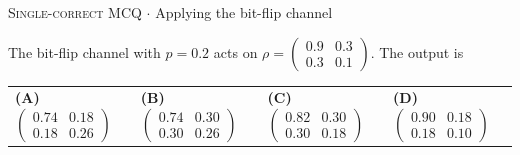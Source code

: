 \documentclass[11pt,a4paper]{article}
\newcommand{\optlabel}[1]{\textbf{(#1)}}
\newcommand{\correctlabel}[1]{\textcolor{okgreen}{\textbf{(#1)}\,\ding{51}}}
\newenvironment{qitem}[1]{\begin{list}{}{\setlength{\leftmargin}{3.3em}\setlength{\labelwidth}{3.1em}%
  \setlength{\labelsep}{0.2em}\setlength{\topsep}{3pt}\setlength{\parsep}{3pt}}\item[\textbf{Q.#1}\hfill]}{\end{list}}
\newcommand{\qmeta}[2]{{\footnotesize\color{black!60}\textsc{#1} \;$\cdot$\; #2}\par}
\begin{document}
\begin{qitem}{44}
\qmeta{Single-correct MCQ}{Applying the bit-flip channel}
The bit-flip channel with $p = 0.2$ acts on $\rho = \begin{pmatrix}0.9 & 0.3\\ 0.3 & 0.1\end{pmatrix}$. The output is
\par\smallskip\noindent\begin{tabularx}{\linewidth}{@{}*{4}{L}@{}}
\optlabel{A}\,$\begin{pmatrix}0.74 & 0.18\\ 0.18 & 0.26\end{pmatrix}$ & \correctlabel{B}\,$\begin{pmatrix}0.74 & 0.30\\ 0.30 & 0.26\end{pmatrix}$ & \optlabel{C}\,$\begin{pmatrix}0.82 & 0.30\\ 0.30 & 0.18\end{pmatrix}$ & \optlabel{D}\,$\begin{pmatrix}0.90 & 0.18\\ 0.18 & 0.10\end{pmatrix}$
\end{tabularx}
\end{qitem}
\end{document}
